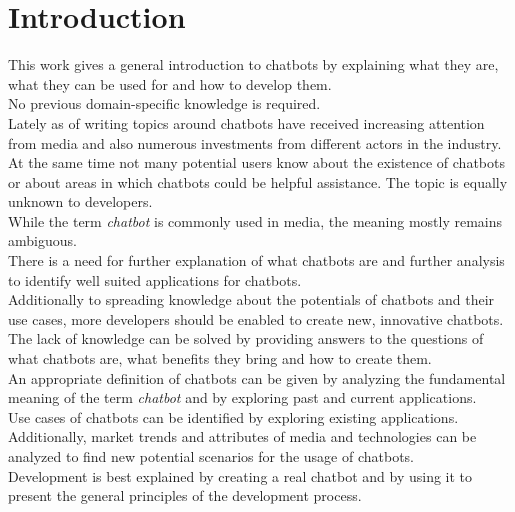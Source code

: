 \chapter{Introduction}

\pagestyle{useheadings} %


This work gives a general introduction to chatbots
by explaining what they are, what they can be used for and how to develop them.
\\
No previous domain-specific knowledge is required.
\\

Lately as of writing topics around chatbots have received increasing attention from media and also numerous investments from different actors in the industry.
\\
At the same time not many potential users know about the existence of chatbots or about areas in which chatbots could be helpful assistance.
The topic is equally unknown to developers.
\\
While the term \emph{chatbot} is commonly used in media, the meaning mostly remains ambiguous.
\\
There is a need for further explanation of what chatbots are and further analysis to identify well suited applications for chatbots.
\\
Additionally to spreading knowledge about the potentials of chatbots and their use cases,
more developers should be enabled to create new, innovative chatbots.
\\

The lack of knowledge can be solved by providing answers to the questions of what chatbots are, what benefits they bring and how to create them.
\\
An appropriate definition of chatbots can be given by analyzing the fundamental meaning of the term \emph{chatbot} and by exploring past and current applications.
\\
Use cases of chatbots can be identified by exploring existing applications. Additionally, market trends and attributes of media and technologies can be analyzed to find new potential scenarios for the usage of chatbots.
\\
Development is best explained by creating a real chatbot and by using it to present the general principles of the development process.
\\

